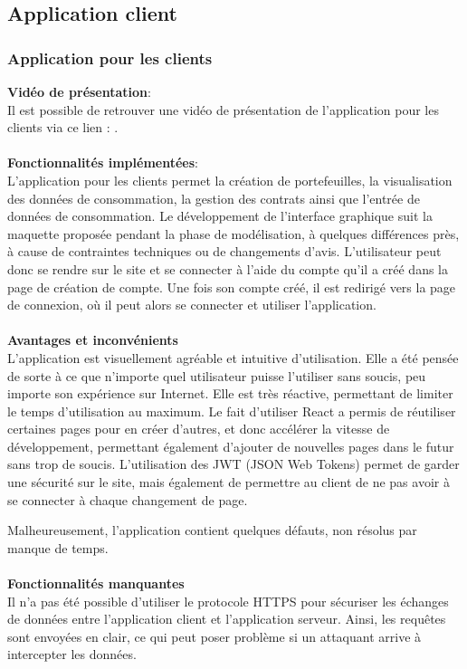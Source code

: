 \documentclass[../rapport.tex]{subfiles}
\begin{document}
\subsection{Application client}
\subsubsection{Application pour les clients}
\noindent \textbf{Vidéo de présentation}: \\ 
Il est possible de retrouver une vidéo de présentation de l'application pour les clients via ce lien : . \\ \\
\textbf{Fonctionnalités implémentées}: \\
L'application pour les clients permet la création de portefeuilles, la visualisation des données de consommation, la gestion des contrats ainsi que l'entrée de données de consommation. 
Le développement de l'interface graphique suit la maquette proposée pendant la phase de modélisation, à quelques différences près, à cause de contraintes techniques ou de changements d'avis. L'utilisateur peut donc se rendre sur le site et se connecter à l'aide du compte qu'il a créé dans la page de création de compte. Une fois son compte créé, il est redirigé vers la page de connexion, où il peut alors se connecter et utiliser l'application.
\\ \\
\textbf{Avantages et inconvénients} \\
L'application est visuellement agréable et intuitive d'utilisation. Elle a été pensée de sorte à ce que n'importe quel utilisateur puisse l'utiliser sans soucis, peu importe son expérience sur Internet. Elle est très réactive, permettant de limiter le temps d'utilisation au maximum. Le fait d'utiliser React a permis de réutiliser certaines pages pour en créer d'autres, et donc accélérer la vitesse de développement, permettant également d'ajouter de nouvelles pages dans le futur sans trop de soucis. L'utilisation des JWT (JSON Web Tokens) permet de garder une sécurité sur le site, mais également de permettre au client de ne pas avoir à se connecter à chaque changement de page.

Malheureusement, l'application contient quelques défauts, non résolus par manque de temps. 
\\ \\
\textbf{Fonctionnalités manquantes} \\
Il n'a pas été possible d'utiliser le protocole HTTPS pour sécuriser les échanges de données entre l'application client et l'application serveur. Ainsi, les requêtes sont envoyées en clair, ce qui peut poser problème si un attaquant arrive à intercepter les données.
\end{document}
